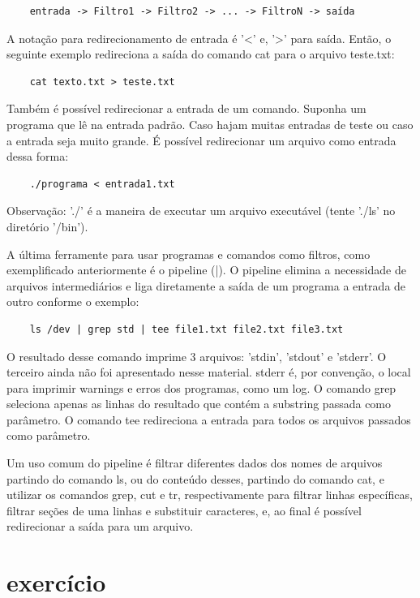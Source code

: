 \documentclass[oneside, 11 pt]{article}
\begin{document}
	\begin{lstlisting}
	entrada -> Filtro1 -> Filtro2 -> ... -> FiltroN -> saída
	\end{lstlisting}
	A notação para redirecionamento de entrada é '<' e, '>' para saída. Então, o seguinte exemplo redireciona a saída do comando cat para o arquivo teste.txt:
	
	\begin{lstlisting}
	cat texto.txt > teste.txt
	\end{lstlisting}
	Também é possível redirecionar a entrada de um comando. Suponha um programa que lê na entrada padrão. Caso hajam muitas entradas de teste ou caso a entrada seja muito grande. É possível redirecionar um arquivo como entrada dessa forma:
	
	\begin{lstlisting}
	./programa < entrada1.txt
	\end{lstlisting}
	Observação: './' é a maneira de executar um arquivo executável (tente './ls' no diretório '/bin').
	
	A última ferramente para usar programas e comandos como filtros, como exemplificado anteriormente é o pipeline (|). O pipeline elimina a necessidade de arquivos intermediários e liga diretamente a saída de um programa a entrada de outro conforme o exemplo:
	
	\begin{lstlisting}
	ls /dev | grep std | tee file1.txt file2.txt file3.txt
	\end{lstlisting}
	O resultado desse comando imprime 3 arquivos: 'stdin', 'stdout' e 'stderr'. O terceiro ainda não foi apresentado nesse material. stderr é, por convenção, o local para imprimir warnings e erros dos programas, como um log.
	O comando grep seleciona apenas as linhas do resultado que contém a substring passada como parâmetro. O comando tee redireciona a entrada para todos os arquivos passados como parâmetro.
	
	Um uso comum do pipeline é filtrar diferentes dados dos nomes de arquivos partindo do comando ls, ou do conteúdo desses, partindo do comando cat, e utilizar os comandos grep, cut e tr, respectivamente para filtrar linhas específicas, filtrar seções de uma linhas e substituir caracteres, e, ao final é possível redirecionar a saída para um arquivo.
	
	\section{exercício}
	
\end{document}
